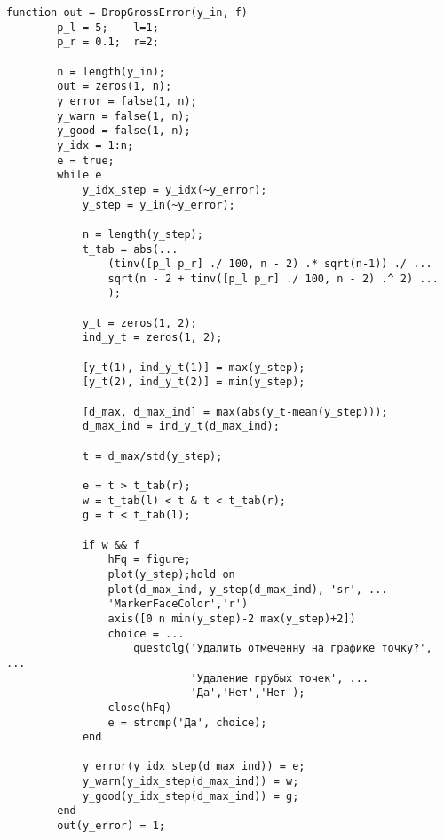 \begin{lstlisting}[label={list:DropGrossError}]
	function out = DropGrossError(y_in, f)
		p_l = 5;    l=1;
		p_r = 0.1;  r=2;
		
		n = length(y_in);
		out = zeros(1, n);
		y_error = false(1, n);
		y_warn = false(1, n);
		y_good = false(1, n);
		y_idx = 1:n;
		e = true;
		while e
			y_idx_step = y_idx(~y_error);
			y_step = y_in(~y_error);
			
			n = length(y_step);
			t_tab = abs(...
				(tinv([p_l p_r] ./ 100, n - 2) .* sqrt(n-1)) ./ ...
				sqrt(n - 2 + tinv([p_l p_r] ./ 100, n - 2) .^ 2) ...
				);
			
			y_t = zeros(1, 2);
			ind_y_t = zeros(1, 2);
			
			[y_t(1), ind_y_t(1)] = max(y_step);
			[y_t(2), ind_y_t(2)] = min(y_step);
			
			[d_max, d_max_ind] = max(abs(y_t-mean(y_step)));    
			d_max_ind = ind_y_t(d_max_ind);
			
			t = d_max/std(y_step);
			
			e = t > t_tab(r);
			w = t_tab(l) < t & t < t_tab(r);
			g = t < t_tab(l);
			
			if w && f
				hFq = figure;
				plot(y_step);hold on
				plot(d_max_ind, y_step(d_max_ind), 'sr', ...
				'MarkerFaceColor','r')
				axis([0 n min(y_step)-2 max(y_step)+2])
				choice = ...
				    questdlg('Удалить отмеченну на графике точку?', ...
				             'Удаление грубых точек', ...
				             'Да','Нет','Нет');
				close(hFq)   
				e = strcmp('Да', choice);
			end
			
			y_error(y_idx_step(d_max_ind)) = e;
			y_warn(y_idx_step(d_max_ind)) = w;
			y_good(y_idx_step(d_max_ind)) = g;    
		end
		out(y_error) = 1;		
\end{lstlisting}
